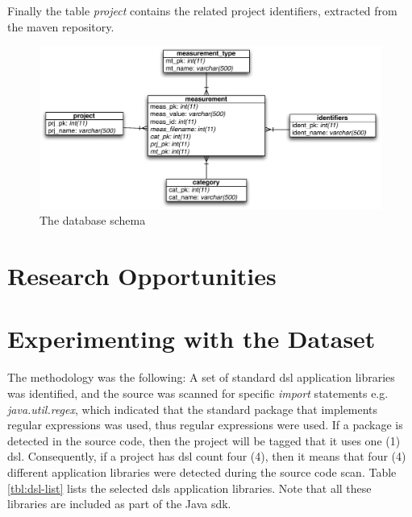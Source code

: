 \documentclass{sig-alternate}
\begin{document}
Finally the table \textit{project} contains the related project identifiers, extracted from the maven repository.

\begin{figure}
\centering
\includegraphics[scale=0.7]{database-schema}
\caption{The database schema}
\label{fig:database-schema}
\end{figure}

\section{Research Opportunities}
\label{sec:research-opportunities}



\section{Experimenting with the Dataset}
\label{sec:dsl}



The methodology was the following: A set of standard {\sc dsl} application libraries was identified, and the source was scanned for specific \textit{import} statements e.g. \textit{java.util.regex}, which indicated that the standard package that implements regular expressions was used, thus regular expressions were used. If a package is detected in the source code, then the project will be tagged that it uses one (1) {\sc dsl}. Consequently, if a project has {\sc dsl} count four (4), then it means that four (4) different application libraries were detected during the source code scan. Table \ref{tbl:dsl-list} lists the selected {\sc dsl}s application libraries. Note that all these libraries are included as part of the Java {\sc sdk}.
\end{document}
